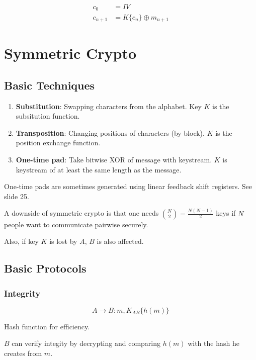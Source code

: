 \documentclass{article}
\begin{document}
\begin{align*}
  c_0 &= IV \\
  c_{n+1} &= K\{c_n\} \oplus m_{n+1}
\end{align*}

\section{Symmetric Crypto}

\subsection{Basic Techniques}

\begin{enumerate}

  \item \textbf{Substitution}: Swapping characters from the alphabet. Key $K$
    is the subsitution function.

  \item \textbf{Transposition}: Changing positions of characters (by block).
    $K$ is the position exchange function.

  \item \textbf{One-time pad}: Take bitwise XOR of message with keystream.
    $K$ is keystream of at least the same length as the message.

\end{enumerate}

One-time pads are sometimes generated using linear feedback shift registers. See
slide 25.

A downside of symmetric crypto is that one needs ${N \choose 2}
= \frac{N(N-1)}{2}$ keys if $N$ people want to communicate pairwise securely.

Also, if key $K$ is lost by $A$, $B$ is also affected.

\subsection{Basic Protocols}

\subsubsection{Integrity}

\[
  A \longrightarrow B : m, K_{AB}\{h(m)\}
\]

Hash function for efficiency.

$B$ can verify integity by decrypting and comparing $h(m)$ with the hash he
creates from $m$.
\end{document}
